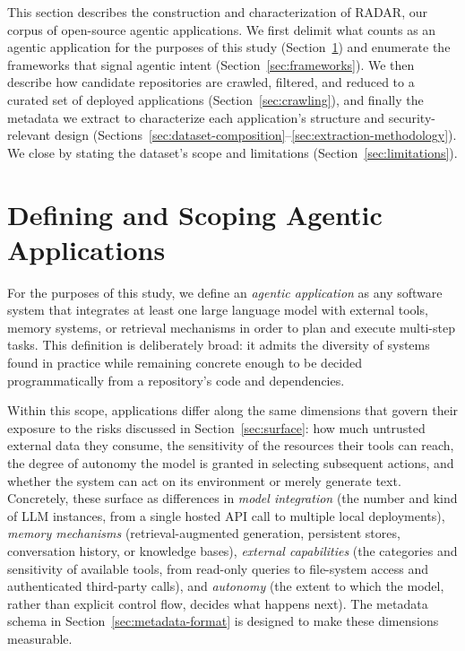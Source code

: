 \label{chap:toolkit}

This section describes the construction and characterization of RADAR, our corpus of open-source agentic applications. We first delimit what counts as an agentic application for the purposes of this study (Section~\ref{sec:defining-agentic}) and enumerate the frameworks that signal agentic intent (Section~\ref{sec:frameworks}). We then describe how candidate repositories are crawled, filtered, and reduced to a curated set of deployed applications (Section~\ref{sec:crawling}), and finally the metadata we extract to characterize each application's structure and security-relevant design (Sections~\ref{sec:dataset-composition}--\ref{sec:extraction-methodology}). We close by stating the dataset's scope and limitations (Section~\ref{sec:limitations}).
 

\section{Defining and Scoping Agentic Applications}
\label{sec:defining-agentic}
 
For the purposes of this study, we define an \emph{agentic application} as any software system that integrates at least one large language model with external tools, memory systems, or retrieval mechanisms in order to plan and execute multi-step tasks. This definition is deliberately broad: it admits the diversity of systems found in practice while remaining concrete enough to be decided programmatically from a repository's code and dependencies.
 
Within this scope, applications differ along the same dimensions that govern their exposure to the risks discussed in Section~\ref{sec:surface}: how much untrusted external data they consume, the sensitivity of the resources their tools can reach, the degree of autonomy the model is granted in selecting subsequent actions, and whether the system can act on its environment or merely generate text. Concretely, these surface as differences in \emph{model integration} (the number and kind of LLM instances, from a single hosted API call to multiple local deployments), \emph{memory mechanisms} (retrieval-augmented generation, persistent stores, conversation history, or knowledge bases), \emph{external capabilities} (the categories and sensitivity of available tools, from read-only queries to file-system access and authenticated third-party calls), and \emph{autonomy} (the extent to which the model, rather than explicit control flow, decides what happens next). The metadata schema in Section~\ref{sec:metadata-format} is designed to make these dimensions measurable.
 
